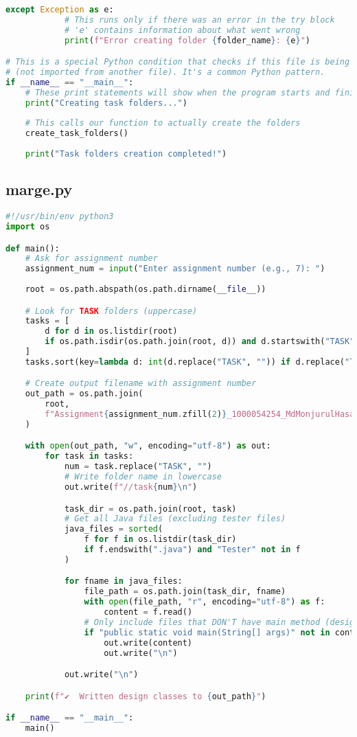 \documentclass[11pt,a4paper]{article}
\begin{document}
\begin{lstlisting}[style=codestyle,language=Python]
        except Exception as e:
            # This runs only if there was an error in the try block
            # 'e' contains information about what went wrong
            print(f"Error creating folder {folder_name}: {e}")

# This is a special Python condition that checks if this file is being run directly
# (not imported from another file). It's a common Python pattern.
if __name__ == "__main__":
    # These print statements will show when the program starts and finishes
    print("Creating task folders...")
    
    # This calls our function to actually create the folders
    create_task_folders()
    
    print("Task folders creation completed!")
\end{lstlisting}

\subsection*{marge.py}
\begin{lstlisting}[style=codestyle,language=Python]
#!/usr/bin/env python3
import os

def main():
    # Ask for assignment number
    assignment_num = input("Enter assignment number (e.g., 7): ")
    
    root = os.path.abspath(os.path.dirname(__file__))

    # Look for TASK folders (uppercase)
    tasks = [
        d for d in os.listdir(root)
        if os.path.isdir(os.path.join(root, d)) and d.startswith("TASK")
    ]
    tasks.sort(key=lambda d: int(d.replace("TASK", "")) if d.replace("TASK", "").isdigit() else d)

    # Create output filename with assignment number
    out_path = os.path.join(
        root,
        f"Assignment{assignment_num.zfill(2)}_1000054254_MdMonjurulHasanBhuiyan.txt"
    )

    with open(out_path, "w", encoding="utf-8") as out:
        for task in tasks:
            num = task.replace("TASK", "")
            # Write folder name in lowercase
            out.write(f"//task{num}\n")

            task_dir = os.path.join(root, task)
            # Get all Java files (excluding tester files)
            java_files = sorted(
                f for f in os.listdir(task_dir)
                if f.endswith(".java") and "Tester" not in f
            )

            for fname in java_files:
                file_path = os.path.join(task_dir, fname)
                with open(file_path, "r", encoding="utf-8") as f:
                    content = f.read()
                # Only include files that DON'T have main method (design files)
                if "public static void main(String[] args)" not in content:
                    out.write(content)
                    out.write("\n")

            out.write("\n")

    print(f"✔️  Written design classes to {out_path}")

if __name__ == "__main__":
    main()
\end{lstlisting}
\end{document}
